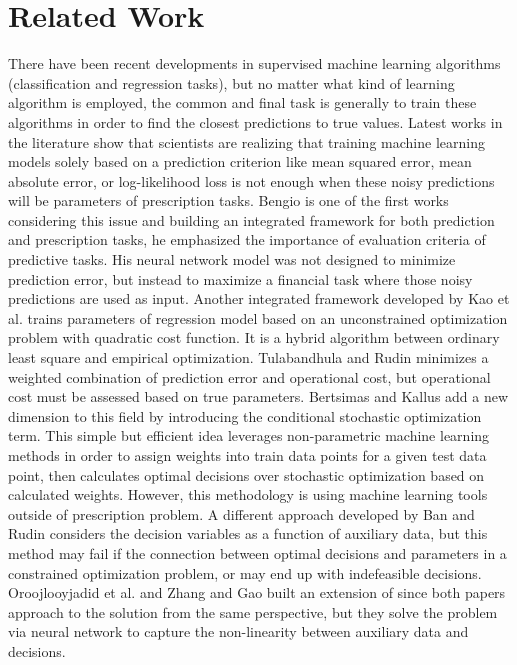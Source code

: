 \documentclass[12pt]{article}
\begin{document}
\section{Related Work}
There have been recent developments in supervised machine learning algorithms (classification and regression tasks), but no matter what kind of learning algorithm is employed, the common and final task is generally to train these algorithms in order to find the closest predictions to true values. 
Latest works in the literature show that scientists are realizing that training machine learning models solely based on a prediction criterion like  mean squared error, mean absolute error, or log-likelihood loss is not enough when these noisy predictions will be parameters of prescription tasks. Bengio \cite{Bengio1997UsingAF} is one of the first works considering this issue and building an integrated framework for both prediction and prescription tasks, he emphasized the importance of evaluation criteria of predictive tasks. His neural network model was not designed to minimize prediction error, but instead to  maximize a financial task where those noisy predictions are used as input. 
Another integrated framework developed by Kao et al.\cite{NIPS2009_3686} trains parameters of regression model based on an unconstrained optimization problem with quadratic cost function. It is a hybrid algorithm between ordinary least square and empirical optimization. Tulabandhula and Rudin \cite{Tulabandhula2011MachineLW} minimizes a weighted combination of prediction error and operational cost, but operational cost must be assessed based on true parameters. Bertsimas and Kallus \cite{doi:10.1287/mnsc.2018.3253} add a new dimension to this field by introducing the conditional stochastic optimization term. This simple but efficient idea leverages non-parametric machine learning methods in order to assign weights into train data points for a given test data point, then calculates optimal decisions over stochastic optimization based on calculated weights. However, this methodology is using machine learning tools outside of prescription problem. 
A different approach developed by Ban and Rudin \cite{Ban2019TheBD} considers the decision variables as a function of auxiliary data, but this method may fail if the connection between optimal decisions and parameters in a constrained optimization problem, or may end up with indefeasible decisions. Oroojlooyjadid et al.\cite{Oroojlooyjadid2016ApplyingDL} and Zhang and Gao \cite{Zhang2017AssessingTP} built an extension of \cite{Ban2019TheBD} since both papers approach to the solution from the same perspective, but they solve the problem via neural network to capture the non-linearity between auxiliary data and decisions. 
\end{document}
